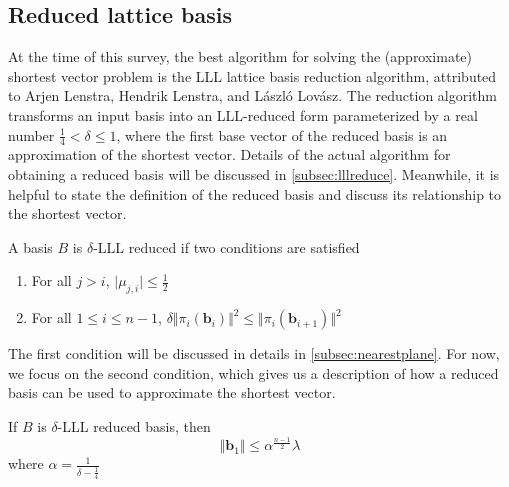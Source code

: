 \subsection{Reduced lattice basis}
At the time of this survey, the best algorithm for solving the (approximate) shortest vector problem is the LLL lattice basis reduction algorithm\cite{lenstra1982factoring}, attributed to Arjen Lenstra, Hendrik Lenstra, and László Lovász. The reduction algorithm transforms an input basis into an LLL-reduced form parameterized by a real number $\frac{1}{4} < \delta \leq 1$, where the first base vector of the reduced basis is an approximation of the shortest vector. Details of the actual algorithm for obtaining a reduced basis will be discussed in \ref{subsec:lllreduce}. Meanwhile, it is helpful to state the definition of the reduced basis and discuss its relationship to the shortest vector.

\begin{definition}
    A basis $B$ is $\delta$-LLL reduced if two conditions are satisfied
    \begin{enumerate}
    \item For all $j > i$, $\vert\mu_{j, i}\vert \leq \frac{1}{2}$
    \item For all $1 \leq i \leq n-1$, $\delta\Vert \pi_i(\mathbf{b}_i)\Vert^2 \leq \Vert\pi_i(\mathbf{b}_{i+1})\Vert^2$
\end{enumerate}
\end{definition}

The first condition will be discussed in details in \ref{subsec:nearestplane}. For now, we focus on the second condition, which gives us a description of how a reduced basis can be used to approximate the shortest vector.

\begin{theorem}
    If $B$ is $\delta$-LLL reduced basis, then
    $$
    \Vert \mathbf{b}_1 \Vert \leq \alpha^\frac{n-1}{2} \lambda
    $$
    where $\alpha = \frac{1}{\delta - \frac{1}{4}}$
\end{theorem}

